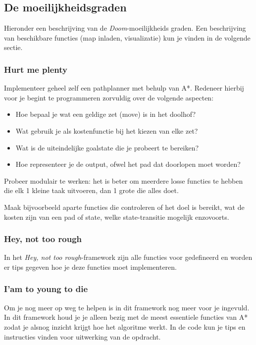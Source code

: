 \documentclass[a4paper]{article}
\begin{document}
\subsection{De moeilijkheidsgraden}
Hieronder een beschrijving van de \textit{Doom}-moeilijkheids graden. Een beschrijving van beschikbare functies (map inladen, visualizatie) kun je vinden in de volgende sectie.

\subsubsection{Hurt me plenty}
Implementeer geheel zelf een pathplanner met behulp van A*. Redeneer hierbij voor je begint te programmeren zorvuldig over de volgende aspecten:
\begin{itemize}
\item Hoe bepaal je wat een geldige zet (move) is in het doolhof?
\item Wat gebruik je als kostenfunctie bij het kiezen van elke zet?
\item Wat is de uiteindelijke goalstate die je probeert te bereiken?
\item Hoe representeer je de output, ofwel het pad dat doorlopen moet worden? 
\end{itemize}

Probeer modulair te werken: het is beter om meerdere losse functies te hebben die elk 1 kleine taak uitvoeren, dan 1 grote die alles doet.

 Maak bijvoorbeeld aparte functies die controleren of het doel is bereikt, wat de kosten zijn van een pad of state, welke state-transitie mogelijk enzovoorts. 

\subsubsection{Hey, not too rough}
In het \textit{Hey, not too rough}-framework zijn alle functies voor gedefineerd en worden er tips gegeven hoe je deze functies moet implementeren.

\subsubsection{I'am to young to die}
Om je nog meer op weg te helpen is in dit framework nog meer voor je ingevuld. In dit framework houd je je alleen bezig met de meest essentiele functies van A* zodat je alsnog inzicht krijgt hoe het algoritme werkt. In de code kun je tips en instructies vinden voor uitwerking van de opdracht.
\end{document}
